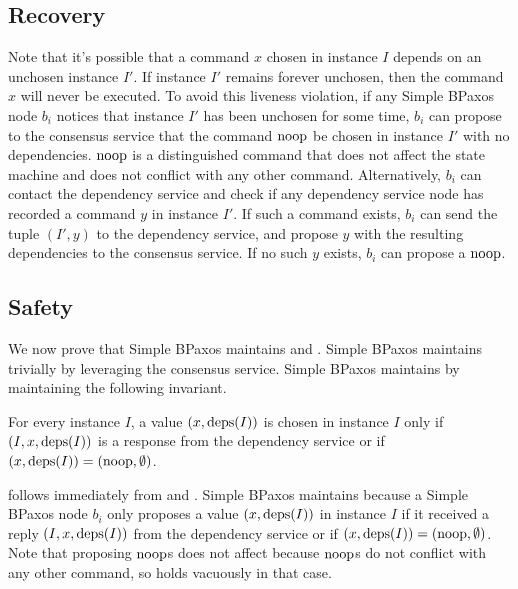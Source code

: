 \subsection{Recovery}
Note that it's possible that a command $x$ chosen in instance $I$ depends on an
unchosen instance $I'$. If instance $I'$ remains forever unchosen, then the
command $x$ will never be executed. To avoid this liveness violation, if any
Simple BPaxos node $b_i$ notices that instance $I'$ has been unchosen for some
time, $b_i$ can propose to the consensus service that the command $\text{noop}$ be
chosen in instance $I'$ with no dependencies. $\text{noop}$ is a distinguished
command that does not affect the state machine and does not conflict with any
other command.
%
Alternatively, $b_i$ can contact the dependency service and check if any
dependency service node has recorded a command $y$ in instance $I'$. If such a
command exists, $b_i$ can send the tuple $(I', y)$ to the dependency service,
and propose $y$ with the resulting dependencies to the consensus service. If no
such $y$ exists, $b_i$ can propose a $\text{noop}$.

\subsection{Safety}
We now prove that Simple BPaxos maintains  and
.
%
Simple BPaxos maintains  trivially by leveraging the
consensus service. Simple BPaxos maintains  by
maintaining the following invariant.

\begin{invariant}
  For every instance $I$, a value $(x, \text{deps}(I))$ is chosen in instance $I$
  only if $(I, x, \text{deps}(I))$ is a response from the dependency service or if
  $(x, \text{deps}(I)) = (\text{noop}, \emptyset)$.
\end{invariant}

 follows immediately from 
and .  Simple BPaxos maintains
 because a Simple BPaxos node $b_i$ only proposes
a value $(x, \text{deps}(I))$ in instance $I$ if it received a reply $(I, x,
\text{deps}(I))$ from the dependency service or if $(x, \text{deps}(I)) = (\text{noop},
\emptyset)$. Note that proposing $\text{noop}{}$s does not affect
 because $\text{noop}$s do not conflict with any other
command, so  holds vacuously in that case.

